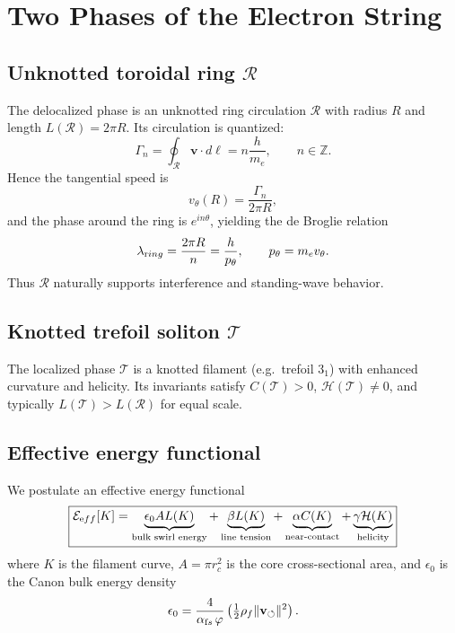 \documentclass[11pt,a4paper]{article}
\begin{document}
\section{Two Phases of the Electron String}

    \subsection{Unknotted toroidal ring $\mathcal R$}

        The delocalized phase is an unknotted ring circulation $\mathcal R$
        with radius $R$ and length $L(\mathcal R)=2\pi R$.
        Its circulation is quantized:
        \begin{equation}
        \Gamma_n = \oint_{\mathcal R} \mathbf v \cdot d\boldsymbol \ell = n \frac{h}{m_e}, \qquad n\in \mathbb Z .
        \end{equation}
        Hence the tangential speed is
        \begin{equation}
        v_\theta(R) = \frac{\Gamma_n}{2\pi R},
        \end{equation}
        and the phase around the ring is $e^{i n\theta}$, yielding the
        de Broglie relation
        \begin{equation}
        \lambda_{\textrm ring} = \frac{2\pi R}{n} = \frac{h}{p_\theta}, \qquad p_\theta = m_e v_\theta .
        \end{equation}
        Thus $\mathcal R$ naturally supports interference and standing-wave behavior.

    \subsection{Knotted trefoil soliton $\mathcal T$}

        The localized phase $\mathcal T$ is a knotted filament
        (e.g.\ trefoil $3_1$) with enhanced curvature and helicity.
        Its invariants satisfy $C(\mathcal T)>0$, $\mathcal H(\mathcal T)\neq 0$,
        and typically $L(\mathcal T)>L(\mathcal R)$ for equal scale.

    \subsection{Effective energy functional}

        We postulate an effective energy functional
        \begin{equation}
        \boxed{
            \mathcal E_{\textrm eff}[K] =
            \underbrace{\epsilon_0 A L(K)}_{\text{bulk swirl energy}} +
            \underbrace{\beta L(K)}_{\text{line tension}} +
            \underbrace{\alpha C(K)}_{\text{near-contact}} +
            \underbrace{\gamma \mathcal H(K)}_{\text{helicity}}
        }
        \end{equation}
        where $K$ is the filament curve,
        $A=\pi r_c^2$ is the core cross-sectional area,
        and $\epsilon_0$ is the Canon bulk energy density
        \begin{equation}
        \epsilon_0 = \frac{4}{\alpha_{\textrm fs}\,\varphi}\left(\tfrac12 \rho_f \|\mathbf v_{\circlearrowleft}\|^2\right).
        \end{equation}
\end{document}
